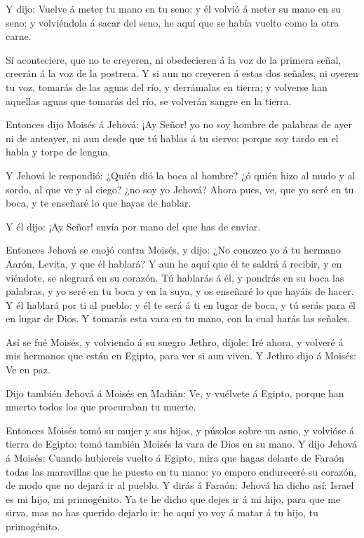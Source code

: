  Y dijo: Vuelve á meter tu mano en tu seno: y él volvió á
meter su mano en su seno; y volviéndola á sacar del seno, he aquí que se
había vuelto como la otra carne.

 Sí aconteciere, que no te creyeren, ni obedecieren á la voz
de la primera señal, creerán á la voz de la postrera.  Y si
aun no creyeren á estas dos señales, ni oyeren tu voz, tomarás de las
aguas del río, y derrámalas en tierra; y volverse han aquellas aguas que
tomarás del río, se volverán sangre en la tierra.

 Entonces dijo Moisés á Jehová: ¡Ay Señor! yo no soy hombre
de palabras de ayer ni de anteayer, ni aun desde que tú hablas á tu
siervo; porque soy tardo en el habla y torpe de lengua.

 Y Jehová le respondió: ¿Quién dió la boca al hombre? ¿ó
quién hizo al mudo y al sordo, al que ve y al ciego? ¿no soy yo Jehová?
 Ahora pues, ve, que yo seré en tu boca, y te enseñaré lo
que hayas de hablar.

 Y él dijo: ¡Ay Señor! envía por mano del que has de
enviar.

 Entonces Jehová se enojó contra Moisés, y dijo: ¿No
conozco yo á tu hermano Aarón, Levita, y que él hablará? Y aun he aquí
que él te saldrá á recibir, y en viéndote, se alegrará en su corazón.
 Tú hablarás á él, y pondrás en su boca las palabras, y yo
seré en tu boca y en la suya, y os enseñaré lo que hayáis de hacer.
 Y él hablará por ti al pueblo; y él te será á ti en lugar
de boca, y tú serás para él en lugar de Dios.  Y tomarás
esta vara en tu mano, con la cual harás las señales.

 Así se fué Moisés, y volviendo á su suegro Jethro, díjole:
Iré ahora, y volveré á mis hermanos que están en Egipto, para ver si aun
viven. Y Jethro dijo á Moisés: Ve en paz.

 Dijo también Jehová á Moisés en Madián: Ve, y vuélvete á
Egipto, porque han muerto todos los que procuraban tu muerte.

 Entonces Moisés tomó su mujer y sus hijos, y púsolos sobre
un asno, y volvióse á tierra de Egipto: tomó también Moisés la vara de
Dios en su mano.  Y dijo Jehová á Moisés: Cuando hubiereis
vuelto á Egipto, mira que hagas delante de Faraón todas las maravillas
que he puesto en tu mano: yo empero endureceré su corazón, de modo que
no dejará ir al pueblo.  Y dirás á Faraón: Jehová ha dicho
así: Israel es mi hijo, mi primogénito.  Ya te he dicho que
dejes ir á mi hijo, para que me sirva, mas no has querido dejarlo ir: he
aquí yo voy á matar á tu hijo, tu primogénito.

